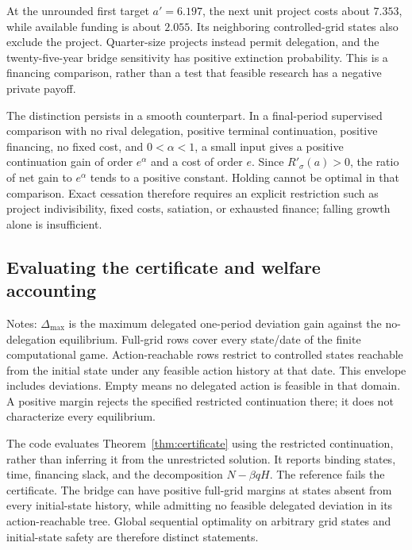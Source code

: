 At the unrounded first target $a'=6.197$, the next unit project costs about $7.353$, while available funding is about $2.055$. Its neighboring controlled-grid states also exclude the project. Quarter-size projects instead permit delegation, and the twenty-five-year bridge sensitivity has positive extinction probability. This is a financing comparison, rather than a test that feasible research has a negative private payoff.

The distinction persists in a smooth counterpart. In a final-period supervised comparison with no rival delegation, positive terminal continuation, positive financing, no fixed cost, and $0<\alpha<1$, a small input gives a positive continuation gain of order $e^\alpha$ and a cost of order $e$. Since $R'_\sigma(a)>0$, the ratio of net gain to $e^\alpha$ tends to a positive constant. Holding cannot be optimal in that comparison. Exact cessation therefore requires an explicit restriction such as project indivisibility, fixed costs, satiation, or exhausted finance; falling growth alone is insufficient.

\subsection{Evaluating the certificate and welfare accounting}
\begin{table}[htbp]\centering\small
\caption{Delegated-deviation margins against the restricted equilibrium}\label{tab:certificate}

\begin{minipage}{\textwidth}\footnotesize\vspace{0.4em}
Notes: $\Delta_{\max}$ is the maximum delegated one-period deviation gain against the no-delegation equilibrium. Full-grid rows cover every state/date of the finite computational game. Action-reachable rows restrict to controlled states reachable from the initial state under any feasible action history at that date. This envelope includes deviations. Empty means no delegated action is feasible in that domain. A positive margin rejects the specified restricted continuation there; it does not characterize every equilibrium.
\end{minipage}
\end{table}

The code evaluates Theorem~\ref{thm:certificate} using the restricted continuation, rather than inferring it from the unrestricted solution. It reports binding states, time, financing slack, and the decomposition $N-\beta qH$. The reference fails the certificate. The bridge can have positive full-grid margins at states absent from every initial-state history, while admitting no feasible delegated deviation in its action-reachable tree. Global sequential optimality on arbitrary grid states and initial-state safety are therefore distinct statements.

